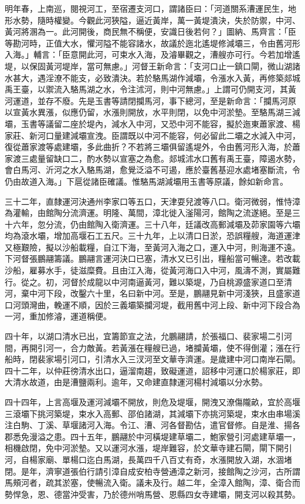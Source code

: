 \begin{pinyinscope}
明年春，上南巡，閱視河工，至宿遷支河口，謂諸臣曰：「河道關系漕運民生，地形水勢，隨時權變。今觀此河狹隘，逼近黃岸，萬一黃堤潰決，失於防禦，中河、黃河將溷為一。此河開後，商民無不稱便，安識日後若何？」圖納、馬齊言：「臣等勘河時，正值大水，懼河隘不能容諸水，故議於迤北遙堤修減壩三，令由舊河形入海。」輔言：「臣意開此河，可束水入海，及濬畢觀之，漕艘亦可行。今若加增遙堤，以保固黃河堤岸，當可無慮。」河督王新命言：「支河口止一鎮口閘，微山湖諸水甚大，遇淫潦不能支，必致潰決。若於駱馬湖作減壩，令漲水入黃，再修築郯城禹王臺，以禦流入駱馬湖之水，令注沭河，則中河無慮。」上謂可仍開支河，其黃河運道，並存不廢。先是玉書等請閉攔馬河，事下總河，至是新命言：「攔馬河原以宣黃水異漲，似應仍留，水漲則開放，水平則閉，以免中河淤墊。至駱馬湖三減壩，玉書等議留二座於堤內，減水入中河，又恐中河不能容，擬於迤東蕭家渡、楊家莊、新河口量建減壩宣洩。臣謂既以中河不能容，何必留此二壩之水減入中河，復從蕭家渡等處建壩，多此曲折？不若將三壩俱留遙堤外，令由舊河形入海，於蕭家渡三處量留缺口二，酌水勢以宣塞之為愈。郯城沭水口舊有禹王臺，障遏水勢，會白馬河、沂河之水入駱馬湖，愈覺泛溢不可遏，應於臺舊基迎水處堵塞斷流，令仍由故道入海。」下扈從諸臣確議。惟駱馬湖減壩用玉書等原議，餘如新命言。

三十二年，直隸運河決通州李家口等五口，天津耍兒渡等八口。衛河微弱，惟恃漳為灌輸，由館陶分流濟運。明隆、萬間，漳北徙入滏陽河，館陶之流遂絕。至是三十六年，忽分流，仍由館陶入衛濟運。三十八年，廷議改高郵減壩及茆家園等六壩均為滾水壩，增加高堰石工五尺。三十九年，上以清口日淤，恐誤糧艘，海道運津又極艱險，擬以沙船載糧，自江下海，至黃河入海之口，運入中河，則海運不遠。下河督張鵬翮籌議。鵬翮言運河決口已塞，清水又已引出，糧船當可暢達。若改載沙船，雇募水手，徒滋糜費。且由江入海，從黃河海口入中河，風濤不測，實屬難行。從之。初，河督於成龍以中河南逼黃河，難以築堤，乃自桃源盛家道口至清河，棄中河下段，改鑿六十里，名曰新中河。至是，鵬翮見新中河淺狹，且盛家道口河頭灣曲，輓運不順，因於三義壩築攔河堤，截用舊中河上段、新中河下段合為一河，重加修濬，運道稱便。

四十年，以湖口清水已出，宜籌節宣之法，允鵬翮請，於張福口、裴家場二引河間，再開引河一，合力敵黃。若黃漲在糧艘已過，堵攔黃壩，使不得倒灌；漲在行船時，閉裴家場引河口，引清水入三汊河至文華寺濟運。是歲建中河口南岸石閘。四十二年，以仲莊徬清水出口，逼溜南趨，致礙運道，詔移中河運口於楊家莊，即大清水故道，由是漕鹽兩利。逾年，又命建直隸運河楊村減壩以分水勢。

四十四年，上言高堰及運河減壩不開放，則危及堤堰，開洩又潦傷隴畝，宜於高堰三滾壩下挑河築堤，束水入高郵、邵伯諸湖，其減壩下亦挑河築堤，束水由串場溪注白駒、丁溪、草堰諸河入海。令江、漕、河各督勘估，遣官督修。自是淮、揚各郡悉免漫溢之患。四十五年，鵬翮於中河橫堤建草壩二，鮑家營引河處建草壩一，相機啟閉，免中河淤墊。又以運河水漲，堤岸難容，於文華寺建石閘，閘下開引河，自楊家廟、單楊口迄白馬湖，長萬四千八百丈有奇，水漲開放入湖，水涸堵閉。是年，濟寧道張伯行請引漳自成安柏寺營通漳之新河，接館陶之沙河，古所謂馬頰河者，疏其淤塞，使暢流入衛。議未及行。越二年，全漳入館陶，漳、衛合而勢悍急，恩、德當沖受害，乃於德州哨馬營、恩縣四女寺建壩，開支河以殺其勢。


\end{pinyinscope}
